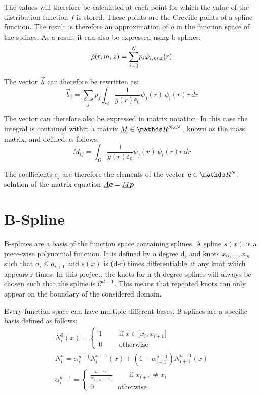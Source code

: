 The values will therefore be calculated at each point for which the value of the distribution function $f$ is stored. These points are the Greville points of a spline function. The result is therefore an approximation of $\hat{\rho}$ in the function space of the splines. As a result it can also be expressed using b-splines:
\begin{equation}\label{eq::rho discretisation}
\hat{\rho}(r,m,z)=\underset{i=0}{\overset{N}{\sum}}p_i\varphi_{i,m,z}(r)
\end{equation}

The vector $\vec{b}$ can therefore be rewritten as:
\begin{equation*}
 \vec{b}_i = \underset{j}{\sum}p_j\int_\Omega\frac{1}{g(r)\varepsilon_0} \psi_j(r) \,\psi_i(r)r\, dr
\end{equation*}

The vector can therefore also be expressed in matrix notation. In this case the integral is contained within a matrix $\mat{M}\in\reel^{N\text{x}N}$, known as the mass matrix, and defined as follows:
\begin{equation}
 M_{ij}=\int_\Omega\frac{1}{g(r)\varepsilon_0} \psi_j(r) \,\psi_i(r)r\, dr
\end{equation}


The coefficients $c_j$ are therefore the elements of the vector $\vec{c}\in\reel^N$, solution of the matrix equation $\underline{A}\boldsymbol{c}=\underline{M}\boldsymbol{p}$

\section{B-Spline}\label{sec::BSplines}

B-splines are a basis of the function space containing splines. A spline $s(x)$ is a piece-wise polynomial function. It is defined by a degree d, and knots $x_0,\dots,x_m$ such that $a_i\leq a_{i+1}$ and $s(x)$ is (d-r) times differentiable at any knot which appears r times\cite{SplineBook}. In this project, the knots for n-th degree splines will always be chosen such that the spline is $\mathcal{C}^{d-1}$. This means that repeated knots can only appear on the boundary of the considered domain.

Every function space can have multiple different bases. B-splines are a specific basis defined as follows:
\begin{gather}
 N_i^0(x)=
 \begin{cases}
  1\quad\quad \text{ if } x\in[x_i,x_{i+1}[\\
  0\quad\quad \text{ otherwise}
 \end{cases}\\
 N_i^{n} = \alpha_i^{n-1}N_i^{n-1}(x)+\left(1-\alpha_{i+1}^{n-1}\right)N_{i+1}^{n-1}(x)\\
 \alpha_i^{n-1}=
 \begin{cases}
  \frac{u-x_i}{x_{i+n}-x_i}\quad\quad \text{ if } x_{i+n}\neq x_i\\
  0\quad\quad\quad \text{ otherwise}
 \end{cases}
\end{gather}

